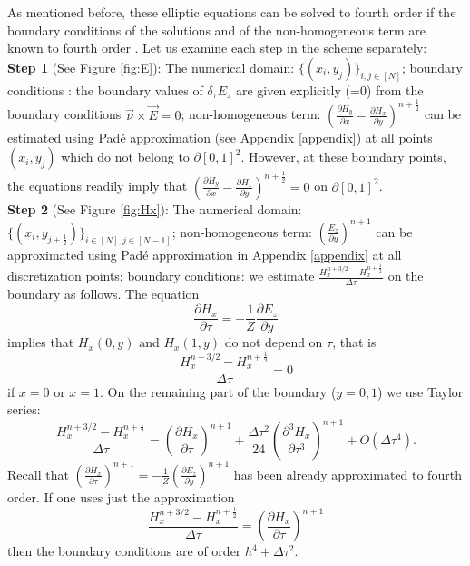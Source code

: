 \documentclass[12pt,reqno]{amsart}
\theoremstyle{definition}
\numberwithin{equation}{section}
\begin{document}
	As mentioned before, these  elliptic equations  can be solved  to fourth order   if the boundary conditions of the solutions and of the non-homogeneous term are known to fourth order \cite{singer_turkel}.
	Let us examine each step in the scheme separately:\\[1mm]
	{\bf Step 1 } (See Figure \ref{fig:E}):  
	The numerical domain: $\{(x_i,y_j)\}_{i,j\in [N]}$; boundary conditions :  the boundary values of $\delta_{\tau} E_z$ are given explicitly (=0) from the boundary conditions $\vec{\nu}\times \vec{E}=0$; non-homogeneous term:
	$\left (\frac{\partial H_y}{\partial x}-\frac{\partial H_x}{\partial y}\right )^{n+\frac{1}{2}}$ can be estimated using Pad\'e approximation (see  Appendix \ref{appendix}) at all points 
	$(x_i,y_j)$
	which do not belong to $\partial [0,1]^2$.  However, at these boundary points, the equations readily imply that  
	$\left (\frac{\partial H_y}{\partial x}-\frac{\partial H_x}{\partial y}\right )^{n+\frac{1}{2}}=0$ on $\partial [0,1]^2$.\\[1mm]
	{\bf Step 2} (See Figure \ref{fig:Hx}): 
	The numerical domain: $\{(x_i,y_{j+\frac{1}{2}})\}_{i\in [N],j\in [N-1]}$; 
	non-homogeneous term:  
	$\left (\frac{E_z}{\partial y}\right)^{n+1} $
	can be approximated  using Pad\'e approximation  in Appendix \ref{appendix} at all discretization points;
	boundary conditions:
	we  estimate 
	$\frac{H_x^{n+3/2}-H_x^{n+\frac{1}{2}}}{\Delta \tau}$ on the boundary as follows.
	The equation  
	$$
	\frac{\partial H_x}{\partial \tau}=-\frac{1}{Z}\frac{\partial E_z}{\partial y}
	$$
	implies that $H_x(0,y)$ and $H_x(1,y)$ do not depend on $\tau$, that is 
	$$\frac{H_x^{n+3/2}-H_x^{n+\frac{1}{2}}}{\Delta \tau}=0$$ if $x=0$ or $x=1$.
	On the remaining part of the boundary ($y=0,1$)  we use Taylor series:
	$$
	\frac{	H_x^{n+3/2}-H_x^{n+\frac{1}{2}}}{\Delta \tau}=
	\left(\frac{\partial H_x}{\partial \tau}\right)^{n+1}+
	\frac{\Delta \tau^2}{24}\left(\frac{\partial^3 H_x}{\partial \tau^3}\right)^{n+1}+O(\Delta \tau^4).
	$$
	Recall that
	$\left(\frac{\partial H_x}{\partial \tau}\right)^{n+1}=-\frac{1}{Z}\left(\frac{\partial E_z}{\partial y}\right)^{n+1}$ has been already approximated to fourth order. 
	If one uses just the approximation 
	$$
	\frac{	H_x^{n+3/2}-H_x^{n+\frac{1}{2}}}{\Delta \tau}=
	\left(\frac{\partial H_x}{\partial \tau}\right)^{n+1}
	$$
	then the boundary conditions are of order $h^4+\Delta \tau^2$.
	
\end{document}
